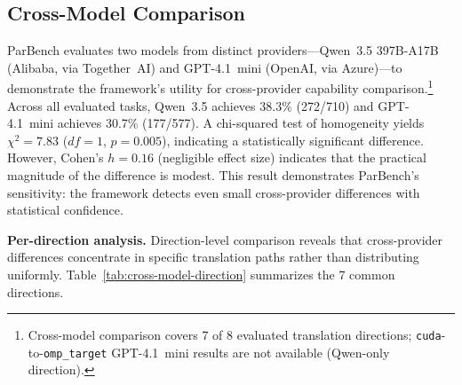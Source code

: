 \documentclass[conference]{IEEEtran}
\begin{document}
\subsection{Cross-Model Comparison}
\label{sec:cross-model}

ParBench evaluates two models from distinct providers---Qwen~3.5 397B-A17B
(Alibaba, via Together~AI) and GPT-4.1~mini (OpenAI, via Azure)---to
demonstrate the framework's utility for cross-provider capability
comparison.\footnote{Cross-model comparison covers 7 of 8 evaluated translation directions; \texttt{cuda}-to-\texttt{omp\_target} GPT-4.1~mini results are not available (Qwen-only direction).}
Across all evaluated tasks, Qwen~3.5 achieves 38.3\% (272/710) and
GPT-4.1~mini achieves 30.7\% (177/577). A chi-squared test of homogeneity
yields $\chi^2 = 7.83$ ($\mathit{df} = 1$, $p = 0.005$),
indicating a statistically significant difference. However, Cohen's $h = 0.16$
(negligible effect size) indicates that the practical magnitude of the
difference is modest. This result demonstrates ParBench's sensitivity: the
framework detects even small cross-provider differences with statistical
confidence.

\textbf{Per-direction analysis.}
Direction-level comparison reveals that cross-provider differences
concentrate in specific translation paths rather than distributing
uniformly. Table~\ref{tab:cross-model-direction} summarizes the 7 common
directions.
\end{document}
